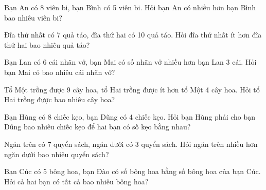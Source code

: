 \begin{ex}
Bạn An có 8 viên bi, bạn Bình có 5 viên bi. Hỏi bạn An có nhiều hơn bạn Bình bao nhiêu viên bi?
\end{ex}

\begin{ex}
Đĩa thứ nhất có 7 quả táo, đĩa thứ hai có 10 quả táo. Hỏi đĩa thứ nhất ít hơn đĩa thứ hai bao nhiêu quả táo?
\end{ex}

\begin{ex}
Bạn Lan có 6 cái nhãn vở, bạn Mai có số nhãn vở nhiều hơn bạn Lan 3 cái. Hỏi bạn Mai có bao nhiêu cái nhãn vở?
\end{ex}

\begin{ex}
Tổ Một trồng được 9 cây hoa, tổ Hai trồng được ít hơn tổ Một 4 cây hoa. Hỏi tổ Hai trồng được bao nhiêu cây hoa?
\end{ex}

\begin{ex}
Bạn Hùng có 8 chiếc kẹo, bạn Dũng có 4 chiếc kẹo. Hỏi bạn Hùng phải cho bạn Dũng bao nhiêu chiếc kẹo để hai bạn có số kẹo bằng nhau?
\end{ex}

\begin{ex}
Ngăn trên có 7 quyển sách, ngăn dưới có 3 quyển sách. Hỏi ngăn trên nhiều hơn ngăn dưới bao nhiêu quyển sách?
\end{ex}

\begin{ex}
Bạn Cúc có 5 bông hoa, bạn Đào có số bông hoa bằng số bông hoa của bạn Cúc. Hỏi cả hai bạn có tất cả bao nhiêu bông hoa?
\end{ex}

